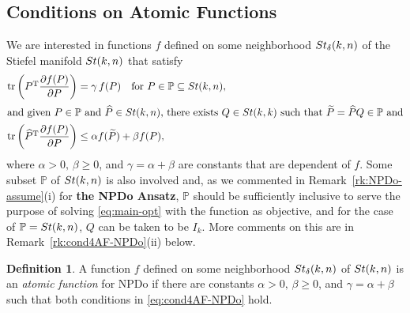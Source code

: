 \documentclass[11pt]{article}
\def\bbP{\mathbb{P}}
\def\wtd{\widetilde}
\def\what{\widehat}
\newcommand\STM[2]{{\rm St}(#1,#2)}
\newcommand\STMnbr{{\rm St}_{\delta}(k,n)}
\DeclareMathOperator{\tr}{tr}
\DeclareMathOperator{\T}{T}
\theoremstyle{definition}
\newtheorem{definition}{Definition}[section]
\numberwithin{equation}{section}
\begin{document}
\subsection{Conditions on Atomic Functions}\label{ssec:AF-NPDo}
We are interested in functions $f$ defined on some neighborhood $\STMnbr$  of the Stiefel manifold $\STM{k}{n}$
that satisfy
\begin{subequations}\label{eq:cond4AF-NPDo}
\begin{align}
\tr\left(P^{\T}\frac{\partial f(P)}{\partial P}\right)&=\gamma\, f(P)\quad\mbox{for $P\in\bbP\subseteq\STM{k}{n}$},
              \label{eq:cond4AF-NPDo-a} \\
\intertext{and given $P\in\bbP$ and $\what P\in\STM{k}{n}$, there exists $Q\in\STM{k}{k}$ such
that $\wtd P=\what PQ\in\bbP$ and}
\tr\left(\what P^{\T}\frac{\partial f(P)}{\partial P}\right)
   &\le\alpha f(\wtd P)+\beta f(P), %
      \label{eq:cond4AF-NPDo-b}
\end{align}
\end{subequations}
where $\alpha>0,\,\beta\ge 0$,  and $\gamma=\alpha+\beta$ are constants that are dependent of $f$.
Some subset $\bbP$ of $\STM{k}{n}$ is also involved and, as we commented in Remark~\ref{rk:NPDo-assume}(i) for
{\bf the NPDo Ansatz}, $\bbP$ should be sufficiently inclusive to serve the purpose of
solving \eqref{eq:main-opt} with the function as objective, and for the case of $\bbP=\STM{k}{n}$,
$Q$ can be taken to be $I_k$. More comments on this are in Remark~\ref{rk:cond4AF-NPDo}(ii) below.

\begin{definition}\label{defn:AF:NPD}
A function $f$ defined on some neighborhood $\STMnbr$ of $\STM{k}{n}$ is an {\em atomic function\/}
for NPDo
if there are constants $\alpha>0,\,\beta\ge 0$, and $\gamma=\alpha+\beta$  such that both conditions in
\eqref{eq:cond4AF-NPDo} hold.
\end{definition}
\end{document}
